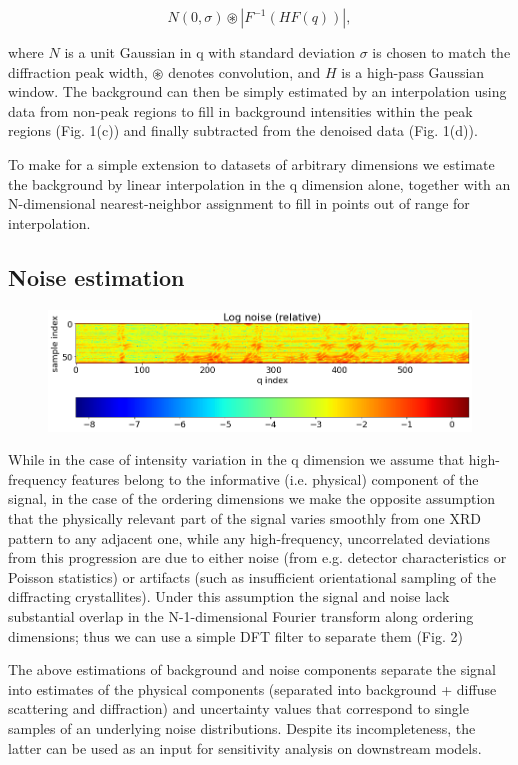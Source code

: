 \documentclass[12pt]{iopart}
\begin{document}
\begin{equation}
N(0, \sigma) \circledast |{F}^{-1}(H  {F}(q))|,
\end{equation}

where $N$ is a unit Gaussian in q with standard deviation $\sigma$ is chosen to match the diffraction peak width, $\circledast$ denotes convolution, and $H$ is a high-pass Gaussian window. The background can then be simply estimated by an interpolation using data from non-peak regions to fill in background intensities within the peak regions (Fig. 1(c)) and finally subtracted from the denoised data (Fig. 1(d)). 

To make for a simple extension to datasets of arbitrary dimensions we estimate the background by linear interpolation in the q dimension alone, together with an N-dimensional nearest-neighbor assignment to fill in points out of range for interpolation. 

\subsection{Noise estimation}
\begin{figure}
  \includegraphics[width=\linewidth]{figures/noise.png}
  \caption{}
  \label{fig:noise}
\end{figure}
While in the case of intensity variation in the q  dimension we assume that high-frequency features belong to the informative (i.e. physical) component of the signal, in the case of the ordering dimensions we make the opposite assumption that the physically relevant part of the signal varies smoothly from one XRD pattern to any adjacent one, while any high-frequency, uncorrelated deviations from this progression are due to either noise (from e.g. detector characteristics or Poisson statistics) or artifacts (such as insufficient orientational sampling of the diffracting crystallites).  Under this assumption the signal and noise lack substantial overlap in the N-1-dimensional Fourier transform along ordering dimensions; thus we can use a simple DFT filter to separate them (Fig. 2)

The above estimations of background and noise components separate the signal into estimates of the physical components (separated into background + diffuse scattering and diffraction) and uncertainty values that correspond to single samples of an underlying noise distributions. Despite its incompleteness, the latter can be used as an input for sensitivity analysis on downstream models.
\end{document}
